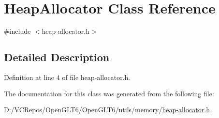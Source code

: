 \hypertarget{class_heap_allocator}{}\section{Heap\+Allocator Class Reference}
\label{class_heap_allocator}


{\ttfamily \#include $<$heap-\/allocator.\+h$>$}



\subsection{Detailed Description}


Definition at line 4 of file heap-\/allocator.\+h.



The documentation for this class was generated from the following file\+:\begin{DoxyCompactItemize}
\item 
D\+:/\+V\+C\+Repos/\+Open\+G\+L\+T6/\+Open\+G\+L\+T6/utils/memory/\mbox{\hyperlink{heap-allocator_8h}{heap-\/allocator.\+h}}\end{DoxyCompactItemize}
